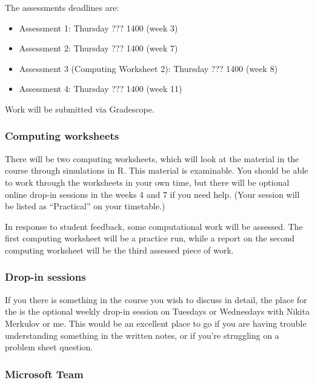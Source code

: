 \documentclass[
  a4paper,
]{article}
\providecommand{\tightlist}{%
  \setlength{\itemsep}{0pt}\setlength{\parskip}{0pt}}
\theoremstyle{definition}
\theoremstyle{definition}
\theoremstyle{definition}
\theoremstyle{remark}
\begin{document}
The assessments deadlines are:

\begin{itemize}
\tightlist
\item
  Assessment 1: Thursday ??? 1400 (week 3)
\item
  Assessment 2: Thursday ??? 1400 (week 7)
\item
  Assessment 3 (Computing Worksheet 2): Thursday ??? 1400 (week 8)
\item
  Assessment 4: Thursday ??? 1400 (week 11)
\end{itemize}

Work will be submitted via Gradescope.

\hypertarget{about-computing}{%
\subsubsection*{Computing worksheets}\label{about-computing}}

There will be two computing worksheets, which will look at the material in the course through simulations in R. This material is examinable. You should be able to work through the worksheets in your own time, but there will be optional online drop-in sessions in the weeks 4 and 7 if you need help. (Your session will be listed as ``Practical'' on your timetable.)

In response to student feedback, some computational work will be assessed. The first computing worksheet will be a practice run, while a report on the second computing worksheet will be the third assessed piece of work.

\hypertarget{dropin}{%
\subsubsection*{Drop-in sessions}\label{dropin}}

If you there is something in the course you wish to discuss in detail, the place for the is the optional weekly drop-in session on Tuesdays or Wednesdays with Nikita Merkulov or me. This would be an excellent place to go if you are having trouble understanding something in the written notes, or if you're struggling on a problem sheet question.

\hypertarget{team}{%
\subsubsection*{Microsoft Team}\label{team}}
\end{document}
